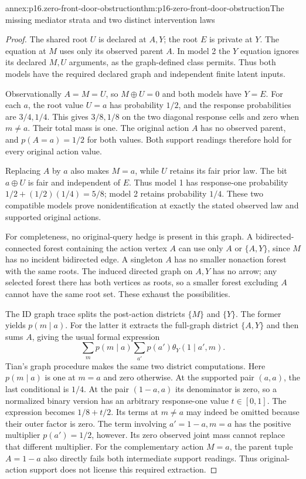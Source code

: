 \begin{annexitem}{annex:p16.zero-front-door-obstruction}{thm:p16-zero-front-door-obstruction}{The missing mediator strata and two distinct intervention laws}
\begin{proof}
The shared root \(U\) is declared at \(A,Y\); the root
\(E\) is private at \(Y\). The equation at \(M\) uses
only its observed parent \(A\). In model 2 the \(Y\) equation
ignores its declared \(M,U\) arguments, as the graph-defined
class permits. Thus both models have the required declared graph
and independent finite latent inputs.

Observationally \(A=M=U\), so \(M\oplus U=0\) and
both models have \(Y=E\). For each \(a\), the root value
\(U=a\) has probability \(1/2\), and the response probabilities
are \(3/4,1/4\). This gives \(3/8,1/8\) on the two
diagonal response cells and zero when \(m\ne a\). Their
total mass is one. The original action \(A\) has no observed
parent, and \(p(A=a)=1/2\) for both values. Both support
readings therefore hold for every original action value.

Replacing \(A\) by \(a\) also makes \(M=a\), while
\(U\) retains its fair prior law. The bit \(a\oplus U\)
is fair and independent of \(E\). Thus model 1 has response-one
probability \(1/2+(1/2)(1/4)=5/8\); model 2 retains
probability \(1/4\). These two compatible models prove
nonidentification at exactly the stated observed law and supported
original actions.

For completeness, no original-query hedge is present in this graph.
A bidirected-connected forest containing the action vertex \(A\)
can use only \(A\) or \(\{A,Y\}\), since \(M\) has
no incident bidirected edge. A singleton \(A\) has no smaller
nonaction forest with the same roots. The induced directed graph
on \(A,Y\) has no arrow; any selected forest there has both
vertices as roots, so a smaller forest excluding \(A\) cannot
have the same root set. These exhaust the possibilities.

The ID graph trace splits the post-action districts \(\{M\}\)
and \(\{Y\}\). The former yields \(p(m\mid a)\).
For the latter it extracts the full-graph district \(\{A,Y\}\)
and then sums \(A\), giving the usual formal expression
\[
 \sum_m p(m\mid a)\sum_{a'}p(a')\theta_Y(1\mid a',m).
\]
Tian's graph procedure makes the same two district computations.
Here \(p(m\mid a)\) is one at \(m=a\) and zero otherwise.
At the supported pair \((a,a)\), the last conditional is
\(1/4\). At the pair \((1-a,a)\) its denominator is zero,
so a normalized binary version has an arbitrary response-one value
\(t\in[0,1]\). The expression becomes \(1/8+t/2\).
Its terms at \(m\ne a\) may indeed be omitted because their
outer factor is zero. The term involving \(a'=1-a,m=a\)
has the positive multiplier \(p(a')=1/2\), however. Its
zero observed joint mass cannot replace that different multiplier.
For the complementary action \(M=a\), the parent tuple
\(A=1-a\) also directly fails both intermediate support readings.
Thus original-action support does not license this required extraction.
\end{proof}
\end{annexitem}

